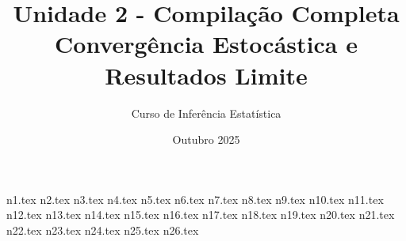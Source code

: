 \documentclass[12pt,a4paper]{article}
\title{Unidade 2 - Compilação Completa\\
\large Convergência Estocástica e Resultados Limite}
\author{Curso de Inferência Estatística}
\date{Outubro 2025}
\begin{document}
\maketitle
\tableofcontents
\newpage

{n1.tex}
{n2.tex}
{n3.tex}
{n4.tex}
{n5.tex}
{n6.tex}
{n7.tex}
{n8.tex}
{n9.tex}
{n10.tex}
{n11.tex}
{n12.tex}
{n13.tex}
{n14.tex}
{n15.tex}
{n16.tex}
{n17.tex}
{n18.tex}
{n19.tex}
{n20.tex}
{n21.tex}
{n22.tex}
{n23.tex}
{n24.tex}
{n25.tex}
{n26.tex}
\end{document}
